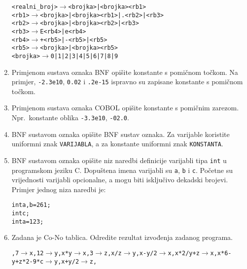 \documentclass[times, 12pt, utf8]{book}
\begin{document}
\begin{enumerate}[resume]
\begin{alltt}
<realni_broj> \(\to\) <brojka> | <brojka> <rb1> 
<rb1> \(\to\) <brojka> | <brojka> <rb1> | . <rb2> | <rb3> 
<rb2> \(\to\) <brojka> | <brojka> <rb2> | <rb3> 
<rb3> \(\to\) E <rb4> | e <rb4> 
<rb4> \(\to\) + <rb5> | - <rb5> | <rb5> 
<rb5> \(\to\) <brojka> | <brojka> <rb5> 
<brojka> \(\to\) 0 | 1 | 2 | 3 | 4 | 5 | 6 | 7 | 8 | 9 
\end{alltt} 

\item
Primjenom sustava oznaka BNF opišite konstante s pomičnom točkom.
Na primjer, \texttt{-2.3e10}, \texttt{0.02} i \texttt{.2e-15} ispravno su zapisane konstante s pomičnom točkom. \cite[str.~81]{udzbenik}

\item
Primjenom sustava oznaka COBOL opišite konstante s pomičnim zarezom.
Npr.~konstante oblika \texttt{-3.3e10}, \texttt{-02.0}. \cite[str.~82]{udzbenik}

\item
BNF sustavom oznaka opišite BNF sustav oznaka.
Za varijable koristite uniformni znak \texttt{VARIJABLA}, a za konstante uniformni znak \texttt{KONSTANTA}. \cite[str.~81]{udzbenik}

\item
BNF sustavom oznaka opišite niz naredbi definicije varijabli tipa \texttt{int} u programskom jeziku C.
Dopuštena imena varijabli su \texttt{a}, \texttt{b} i \texttt{c}.
Početne su vrijednosti varijabli opcionalne, a mogu biti isključivo dekadski brojevi.
Primjer jednog niza naredbi je: \cite[str.~81]{udzbenik}

\begin{alltt}
int a, b=261;
int c;
int a=123;
\end{alltt}

\item
Zadana je Co-No tablica.
Odredite rezultat izvođenja zadanog programa. \cite[str.~83-84]{udzbenik} \cite{auditorne}

\texttt{,7\(\to\)x,12\(\to\)y,x*y\(\to\)x,3\(\to\)z,x/z\(\to\)y,x-y/2\(\to\)x,x*2/y+z\(\to\)x,x*6-y+z*2-9*c\(\to\)y,x+y/2\(\to\)z,}


\end{enumerate}
\end{document}
